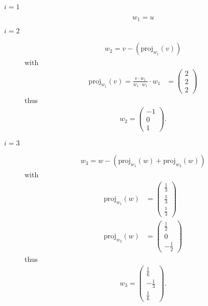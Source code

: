 \documentclass{article}
\newcommand{\proj}{\text{proj}}
\begin{document}
\begin{description}
    \item[$i = 1$] \begin{equation*}
        w_1 = u
    \end{equation*}

    \item[$i = 2$] \begin{align*}
        w_2 = v - (\proj_{w_1}(v))
    \end{align*}
    with
    \begin{align*}
        \proj_{w_1}(v) = \frac{v \cdot w_1}{w_1 \cdot w_1} \cdot w_1 &= \begin{pmatrix}
            2 \\ 2 \\ 2
        \end{pmatrix}
    \end{align*}
    thus
    \begin{align*}
        w_2 = \begin{pmatrix}
            -1 \\ 0 \\ 1
        \end{pmatrix}.
    \end{align*}

    \item[$i = 3$] \begin{align*}
        w_3 = w - (\proj_{w_1}(w) + \proj_{w_2}(w))
    \end{align*}
    with
    \begin{align*}
        \proj_{w_1}(w) &= \begin{pmatrix}
            \frac{1}{3} \\ \frac{1}{3} \\ \frac{1}{3}
        \end{pmatrix}\\
        \proj_{w_2}(w) &= \begin{pmatrix}
            \frac{1}{2} \\ 0 \\ -\frac{1}{2}
        \end{pmatrix}
    \end{align*}
    thus
    \begin{align*}
        w_3 = \begin{pmatrix}
            \frac{1}{6} \\ -\frac{1}{3} \\ \frac{1}{6}
        \end{pmatrix}.
    \end{align*}
\end{description}
\end{document}
